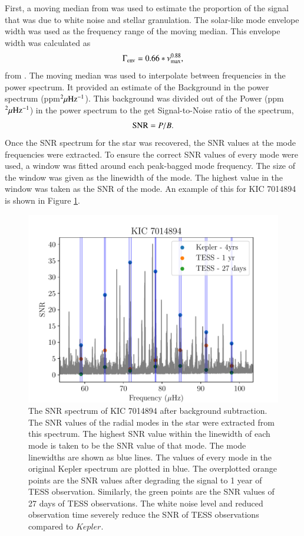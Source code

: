 \documentclass[a4paper,fleqn,usenatbib,useAMS]{mnras}
\newcommand{\numax}{\ensuremath{\nu_{\textrm{max}}}}
\newcommand{\kep}{\ensuremath{Kepler}\:}
\begin{document}
First, a moving median from \citet{davies_asteroseismology_2016} was used to estimate the proportion of the signal that was due to white noise and stellar granulation. The solar-like mode envelope width was used as the frequency range of the moving median. This envelope width was calculated as
\begin{equation}
\Gamma_{\rm env} = 0.66 * \numax^{0.88},
\end{equation}
from \citet{mosser_characterization_2012}. The moving median was used to interpolate between frequencies in the power spectrum. It provided an estimate of the Background in the power spectrum (ppm$^{2} \mu\rm Hz^{-1}$). This background was divided out of the Power (ppm$^{2} \mu\rm Hz^{-1}$) in the power spectrum to the get Signal-to-Noise ratio of the spectrum,
\begin{equation}
\label{eq:snr}
{\rm SNR} = P/B.
\end{equation}
Once the SNR spectrum for the star was recovered, the SNR values at the mode frequencies were extracted. To ensure the correct SNR values of every mode were used, a window was fitted around each peak-bagged mode frequency. The size of the window was given as the linewidth of the mode. The highest value in the window was taken as the SNR of the mode. An example of this for KIC 7014894 is shown in Figure \ref{snr}.
\begin{figure}
	\centering
	\includegraphics[scale=0.6]{plot4_SNR7014894.pdf}
	\caption{The SNR spectrum of KIC 7014894 after background subtraction. The SNR values of the radial modes in the star were extracted from this spectrum. The highest SNR value within the linewidth of each mode is taken to be the SNR value of that mode. The mode linewidths are shown as blue lines. The values of every mode in the original Kepler spectrum are plotted in blue. The overplotted orange points are the SNR values after degrading the signal to 1 year of TESS observation. Similarly, the green points are the SNR values of 27 days of TESS observations. The white noise level and reduced observation time severely reduce the SNR of TESS observations compared to \kep.}	
	\label{snr}
\end{figure}
\end{document}
